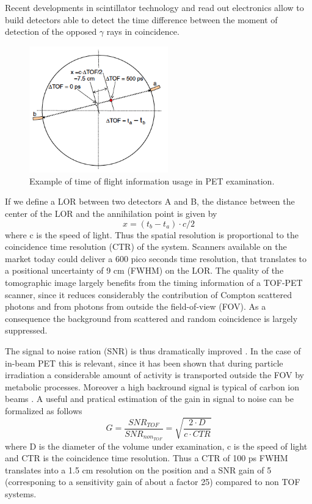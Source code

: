 Recent developments in scintillator technology and read out electronics allow to build detectors able to detect the time difference between the moment of detection of the opposed $\gamma$ rays in coincidence. 
\begin{figure}
\centering  
\includegraphics[width=6cm]{Pictures/Chapter_1/TOF}
\caption[TOF-PET schematics]{Example of time of flight information usage in PET examination.}
\label{fig:TOF}
\end{figure}
If we define a LOR between two detectors A and B, the distance between the center of the LOR and the annihilation point is given by
\begin{equation}
x = (t_{b}-t_{a} ) \cdot c/2
\end{equation}
where c is the speed of light.
Thus the spatial resolution is proportional to the coincidence time resolution (CTR) of the system.
Scanners available on the market today could deliver a 600 pico seconds time resolution, that translates to a positional uncertainty of 9 cm (FWHM) on the LOR.
The quality of the tomographic image largely benefits from the timing information of a TOF-PET scanner, since it reduces considerably  the contribution of Compton scattered photons and from photons from outside the field-of-view (FOV). As a consequence the background from scattered and random coincidence is largely suppressed.

The signal to noise ration (SNR) is thus dramatically improved \cite{Karp2008}.
In the case of in-beam PET this is relevant, since it has been shown \cite{Fiedler2006} that during particle irradiation a considerable amount of activity is transported outside the FOV by metabolic processes. Moreover a high backround signal is typical of carbon ion beams \cite{Enghardt2004}. 
A useful and pratical estimation of the gain in signal to noise can be formalized as follows
\begin{displaymath}
G = \frac{SNR_{TOF}}{SNR_{non_{TOF}}} = \sqrt{\frac{2\cdot D}{c \cdot CTR}}
\end{displaymath}
where D is the diameter of the volume under examination, c is the speed of light and CTR is the coincidence time resolution. Thus a CTR of 100 ps FWHM translates into a 1.5 cm resolution on the position and a SNR gain of 5 (corresponing to a sensitivity gain of about a factor 25) compared to non TOF systems.

